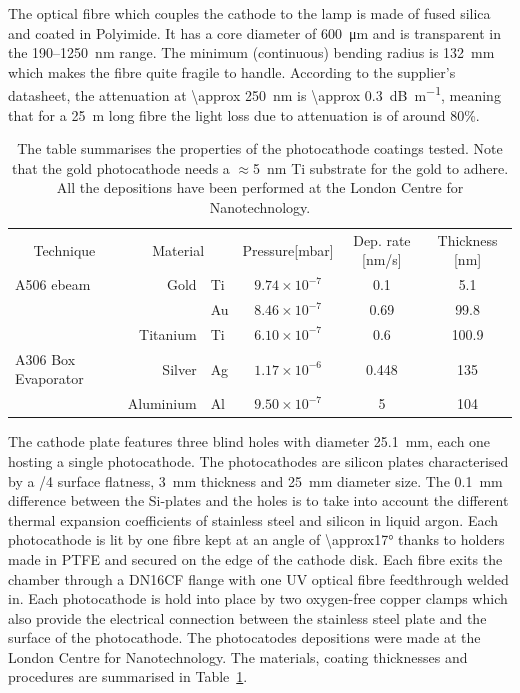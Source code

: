 \documentclass[a4paper,11pt]{article}
\begin{document}
The optical fibre which couples the cathode to the lamp is made of fused silica and coated in Polyimide. It has a core diameter of \SI{600}{\micro m} and is transparent in the 190--\SI{1250}{nm} range. The minimum (continuous) bending radius is \SI{132}{mm} which makes the fibre quite fragile to handle. According to the supplier's datasheet, the attenuation at \SI{\approx 250}{nm} is \SI{\approx 0.3}{dB\per\metre}, meaning that for a \SI{25}{m} long fibre the light loss due to attenuation is of around 80\%. 

\begin{table}[tb]
\centering
\caption[]{The table summarises the properties of the photocathode coatings tested. Note that the gold photocathode needs a $\approx$\SI{5}{nm} Ti substrate for the gold to adhere. All the depositions have been performed at the London Centre for Nanotechnology.}
    
    \smallskip
    \begin{tabular} {@{}lrlccc@{}}
    \toprule
    \multicolumn{1}{c}{Technique} &\multicolumn{2}{c}{Material} &\multicolumn{1}{c}{Pressure[mbar]} &\multicolumn{1}{c}{Dep. rate [nm/s]} &\multicolumn{1}{c}{Thickness [nm]} \\
    \cmidrule(r){1-1}\cmidrule(l){2-3}\cmidrule(l){4-6}
    A506 ebeam          & Gold      & Ti & $9.74\times10^{-7}$ & 0.1   & 5.1\\
                        &           & Au & $8.46\times10^{-7}$ & 0.69  & 99.8\\
                        & Titanium  & Ti & $6.10\times10^{-7}$ & 0.6   & 100.9\\
    A306 Box Evaporator & Silver    & Ag & $1.17\times10^{-6}$ & 0.448 & 135\\
                        & Aluminium & Al & $9.50 \times10^{-7}$ & 5     & 104\\
    
    \end{tabular}
    \label{tab:photocathodes}
\end{table}

The cathode plate features three blind holes with diameter \SI{25.1}{mm},  each one hosting a single photocathode. 
The photocathodes are silicon plates characterised by a \textlambda/4 surface flatness, \SI{3}{mm} thickness and \SI{25}{mm} diameter size. 
The \SI{0.1}{mm} difference between the Si-plates and the holes is to take into account the different thermal expansion coefficients of stainless steel and silicon in liquid argon. 
Each photocathode is lit by one fibre kept at an angle of \ang{\approx17} thanks to holders made in PTFE and secured on the edge of the cathode disk.  Each fibre exits the chamber through a DN16CF flange with one UV optical fibre feedthrough welded in. 
Each photocathode is hold into place by two oxygen-free copper clamps which also provide the electrical connection between the stainless steel plate and the surface of the photocathode. 
The photocatodes depositions were made at the London Centre for Nanotechnology. The materials, coating thicknesses and procedures are summarised in Table~\ref{tab:photocathodes}.
\end{document}
